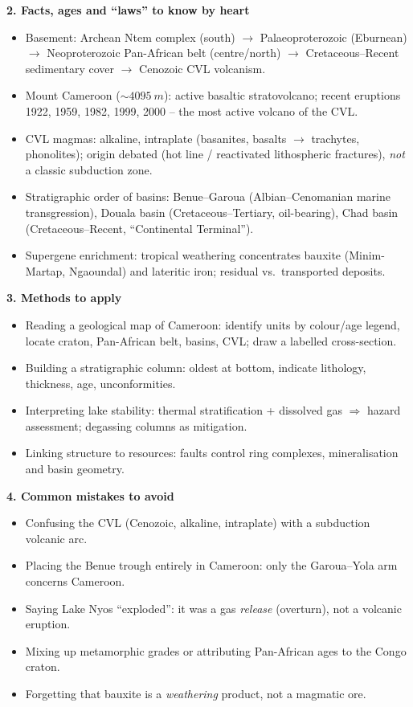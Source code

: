 \documentclass[11pt]{article}
\newcommand{\cle}[1]{{\popxbold\color{popdark}#1}}
\begin{document}
\begin{bilan}
\textbf{2. Facts, ages and ``laws'' to know by heart}
\begin{itemize}
\item Basement: Archean Ntem complex (south) $\rightarrow$ Palaeoproterozoic (Eburnean) $\rightarrow$ Neoproterozoic Pan-African belt (centre/north) $\rightarrow$ Cretaceous--Recent sedimentary cover $\rightarrow$ Cenozoic CVL volcanism.
\item Mount Cameroon ($\sim\SI{4095}{m}$): active basaltic stratovolcano; recent eruptions 1922, 1959, 1982, 1999, 2000 -- the most active volcano of the CVL.
\item CVL magmas: alkaline, intraplate (basanites, basalts $\rightarrow$ trachytes, phonolites); origin debated (hot line / reactivated lithospheric fractures), \emph{not} a classic subduction zone.
\item Stratigraphic order of basins: Benue--Garoua (Albian--Cenomanian marine transgression), Douala basin (Cretaceous--Tertiary, oil-bearing), Chad basin (Cretaceous--Recent, ``Continental Terminal'').
\item Supergene enrichment: tropical weathering concentrates \cle{bauxite} (Minim-Martap, Ngaoundal) and lateritic iron; residual vs.\ transported deposits.
\end{itemize}

\textbf{3. Methods to apply}
\begin{itemize}
\item Reading a geological map of Cameroon: identify units by colour/age legend, locate craton, Pan-African belt, basins, CVL; draw a labelled cross-section.
\item Building a stratigraphic column: oldest at bottom, indicate lithology, thickness, age, unconformities.
\item Interpreting lake stability: thermal stratification + dissolved gas $\Rightarrow$ hazard assessment; degassing columns as mitigation.
\item Linking structure to resources: faults control ring complexes, mineralisation and basin geometry.
\end{itemize}

\textbf{4. Common mistakes to avoid}
\begin{itemize}
\item Confusing the CVL (Cenozoic, alkaline, intraplate) with a subduction volcanic arc.
\item Placing the Benue trough entirely in Cameroon: only the Garoua--Yola arm concerns Cameroon.
\item Saying Lake Nyos ``exploded'': it was a gas \emph{release} (overturn), not a volcanic eruption.
\item Mixing up metamorphic grades or attributing Pan-African ages to the Congo craton.
\item Forgetting that bauxite is a \emph{weathering} product, not a magmatic ore.
\end{itemize}


\end{bilan}
\end{document}
